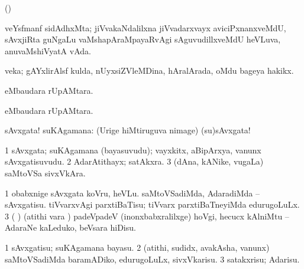 {{{\bentry
{} 
\gl{\nA}
\bmng
(\AmA) 
\emng
\eentry

\bentry
{} 
\gl{\nA}
\expl{}
\bmng
{} 
\emng
\eentry

\bentry
{} 
\gl{\nA}
\expl{}
\bmng
veYsfmanf sidAdhxMta; jiVvakaNdalilxna jiVvadarxvayx aviciPxnanxveMdU, sAvxjiRta guNgaLu vaMshapAraMpayaRvAgi sAguvudillxveMdU heVLuva, anuvaMshiVyatA vAda. 
\emng
\eentry

\bentry
{} 
\gl{\nA}
\expl{}
\bmng
veka; gAYxlirAlsf kulda, nUyxsiZVleMDina, hAralArada, oMdu bageya hakikx. 
\emng
\eentry

\bentry
{} 
\gl{\gu}
\expl{}
\bmng
{} eMbaudara rUpAMtara. 
\emng
\eentry

\bentry
{} 
\gl{\nA}
\expl{}
\bmng
{} eMbaudara rUpAMtara. 
\emng
\eentry

\bentry
{} 
\gl{\akirx}
\expl{}
\bmng
{} 
\emng
\eentry

\bentry
{} 
\gl{\BAavayx}
\expl{}
\bmng
sAvxgata! suKAgamana:  (Urige hiMtiruguva nimage) (su)sAvxgata! 
\emng
\eentry

\bentry
{} 
\gl{\nA}
\expl{}
\bmng
\bnum
\num{1} sAvxgata; suKAgamana (bayasuvudu); vayxkitx, aBipArxya, \mo vanunx sAvxgatisuvudu. 
\num{2} AdarAtithayx; satAkxra. 
\num{3} (dAna, kANike, \mo vugaLa) saMtoVSa sivxVkAra. 
\enum
\emng

\noindent 
\gl{\pagu}
\expl{}
\bmng
\bnum
\num{1}  obabxnige sAvxgata koVru, heVLu. 
  
\banum
{} saMtoVSadiMda, AdaradiMda -- sAvxgatisu. 
 tiVvarxvAgi parxtiBaTisu; tiVvarx parxtiBaTneyiMda edurugoLuLx. 
\eanum
\numie
\num{3}  ( ) (atithi \mo vara \vi) padeVpadeV (inonxbabxralilxge) hoVgi, hecucx kAlniMtu -- AdaraNe kaLeduko, beVsara hiDisu. 
\enum
\emng
\eentry

\bentry
{} 
\gl{\sakirx}
\expl{}
\bmng
\bnum
\num{1} sAvxgatisu; suKAgamana bayasu. 
\num{2} (atithi, sudidx, avakAsha, \mo vanunx) saMtoVSadiMda baramADiko, edurugoLuLx, sivxVkarisu. 
\num{3} satakxrisu; Adarisu. 
\enum
\emng
\eentry

}}}
